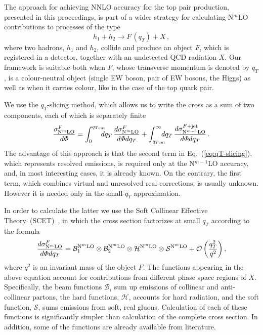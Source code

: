 \documentclass{PoS}
\newcommand{\calB}{\mathcal B}
\newcommand{\calS}{\mathcal S}
\newcommand{\calH}{\mathcal H}
\newcommand{\order}[1]{{{\cal O}\left(#1\right)}}
\begin{document}
The approach for achieving NNLO accuracy for the top pair production,
presented in this proceedings, is part of a wider strategy for calculating
N$^m$LO contributions to processes of the type
%
\begin{equation}
  h_1 + h_2 \to F\, {\textstyle (q_T)} + X\,,
\end{equation}
%
where two hadrons, $h_1$ and $h_2$, collide and produce an object $F$, which is
registered in a detector, together with an undetected QCD radiation $X$. 
%
Our framework is suitable both when $F$, whose transverse momentum is denoted by
$q_T$, is a colour-neutral object (single EW boson, pair of EW bosons, the
Higgs) as well as when it carries colour, like in the case of the top quark
pair. 

We use the $q_T$-slicing method, which allows us to write the cross as a sum of
two components, each of which is separately finite~\cite{Catani:2007vq,
Bonciani:2015sha}
%
\begin{equation}
  \frac{\sigma_{{\rm N}^m{\rm LO}}^{F}}{d\Phi} = 
  \int^{q_{T{\rm cut}}}_0 
  \!\!\!\!\! d q_T\,
  \frac{d\sigma^{F}_{{\rm N}^m{\rm LO}}}{d\Phi dq_T} +
  \int_{q_{T{\rm cut}}}^\infty 
  \!\!\!\!\! d q_T\,
  \frac{d\sigma^{F + {\rm jet}}_{{\rm N}^{m-1}{\rm LO}}}{d\Phi dq_T}\,.
  \label{eq:qT-slicing}
\end{equation}
%
The advantage of this approach is that the second term in
Eq.~(\ref{eq:qT-slicing}), which represents resolved emissions, is required only
at the N$^{m-1}$LO accuracy, and, in most interesting cases, it is already
known.  On the contrary, the first term, which combines virtual and unresolved
real corrections, is usually unknown. However it is needed only in the
small-$q_T$ approximation.

In order to calculate the latter we use the Soft Collinear Effective
Theory~(SCET)~\cite{Becher:2014oda}, in which the cross section factorizes at
small $q_T$ according to the formula
%
\begin{equation}
  \frac{d\sigma^F_{{\rm N}^m{\rm LO}}}{d\Phi dq_T} = 
  \calB_1^{{\rm N}^m{\rm LO}}\otimes
  \calB_2^{{\rm N}^m{\rm LO}}\otimes
  \calH^{{\rm N}^m{\rm LO}}\otimes
  \calS^{{\rm N}^m{\rm LO}} +
  \order{\frac{q_T^2}{q^2}} \,,
  \label{eq:smallqT-cs}
\end{equation}
%
where $q^2$ is an invariant mass of the object $F$.
%
The functions appearing in the above equation account for contributions from
different phase space regions of $X$. Specifically, the beam functions $\calB_i$
sum up emissions of collinear and anti-collinear partons, the hard functions,
$\calH$, accounts for hard radiation, and the soft function, $\calS$, sums
emissions from soft, real gluons.
%
Calculation of each of these functions is significantly simpler than 
calculation of the complete cross section. In addition, some of the functions
are already available from literature.
\end{document}
